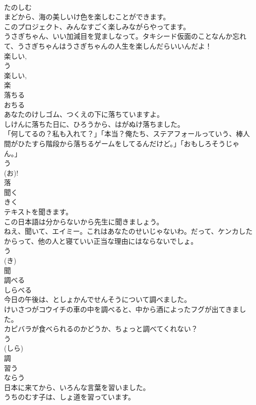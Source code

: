 \documentclass[8pt]{extreport}
\begin{document}
\begin{CJK}{UTF8}{min}
\\	たのしむ	
\\	まどから、海の美しいけ色を楽しむことができます。	
\\	このプロジェクト、みんなすごく楽しみながらやってます。	
\\	うさぎちゃん、いい加減目を覚ましなって。タキシード仮面のことなんか忘れて、うさぎちゃんはうさぎちゃんの人生を楽しんだらいいんだよ！	
\\	楽しい, 
\\	う 
\\	楽しい, 
\\	楽	
\\	落ちる	
\\	おちる	
\\	あなたのけしゴム、つくえの下に落ちていますよ。	
\\	しけんに落ちた日に、ひろうから、はがぬけ落ちました。	
\\	「何してるの？私も入れて？」「本当？俺たち、ステアフォールっていう、棒人間がひたすら階段から落ちるゲームをしてるんだけど。」「おもしろそうじゃん。」	
\\	う 
\\	(お)!
\\	落	
\\	聞く	
\\	きく	
\\	テキストを聞きます。	
\\	この日本語は分からないから先生に聞きましょう。	
\\	ねえ、聞いて、エイミー。これはあなたのせいじゃないわ。だって、ケンカしたからって、他の人と寝ていい正当な理由にはならないでしょ。	
\\	う 
\\	(き) 
\\	聞	
\\	調べる	
\\	しらべる	
\\	今日の午後は、としょかんでせんそうについて調べました。	
\\	けいさつがコウイチの車の中を調べると、中から酒によったフグが出てきました。	
\\	カピバラが食べられるのかどうか、ちょっと調べてくれない？	
\\	う 
\\	(しら) 
\\	調	
\\	習う	
\\	ならう	
\\	日本に来てから、いろんな言葉を習いました。	
\\	うちのむす子は、しょ道を習っています。	

\end{CJK}
\end{document}
